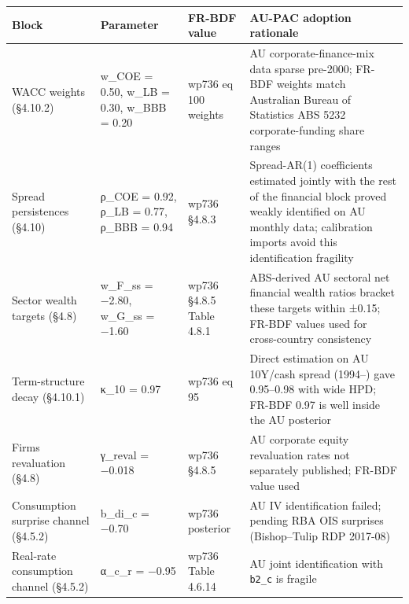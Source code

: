 \documentclass[
]{article}
\newcounter{none} %
\begin{document}
{\def\LTcaptype{none} %
\begin{longtable}[]{@{}
  >{\raggedright\arraybackslash}p{}
  >{\raggedright\arraybackslash}p{}
  >{\raggedright\arraybackslash}p{}
  >{\raggedright\arraybackslash}p{}@{}}
\toprule\noalign{}
\begin{minipage}[b]{\linewidth}\raggedright
Block
\end{minipage} & \begin{minipage}[b]{\linewidth}\raggedright
Parameter
\end{minipage} & \begin{minipage}[b]{\linewidth}\raggedright
FR-BDF value
\end{minipage} & \begin{minipage}[b]{\linewidth}\raggedright
AU-PAC adoption rationale
\end{minipage} \\
\midrule\noalign{}
\endhead
\bottomrule\noalign{}
\endlastfoot
WACC weights (§4.10.2) & w\_COE = 0.50, w\_LB = 0.30, w\_BBB = 0.20 &
wp736 eq 100 weights & AU corporate-finance-mix data sparse pre-2000;
FR-BDF weights match Australian Bureau of Statistics ABS 5232
corporate-funding share ranges \\
Spread persistences (§4.10) & ρ\_COE = 0.92, ρ\_LB = 0.77, ρ\_BBB = 0.94
& wp736 §4.8.3 & Spread-AR(1) coefficients estimated jointly with the
rest of the financial block proved weakly identified on AU monthly data;
calibration imports avoid this identification fragility \\
Sector wealth targets (§4.8) & w\_F\_ss = −2.80, w\_G\_ss = −1.60 &
wp736 §4.8.5 Table 4.8.1 & ABS-derived AU sectoral net financial wealth
ratios bracket these targets within ±0.15; FR-BDF values used for
cross-country consistency \\
Term-structure decay (§4.10.1) & κ\_10 = 0.97 & wp736 eq 95 & Direct
estimation on AU 10Y/cash spread (1994--) gave 0.95--0.98 with wide HPD;
FR-BDF 0.97 is well inside the AU posterior \\
Firms revaluation (§4.8) & γ\_reval = −0.018 & wp736 §4.8.5 & AU
corporate equity revaluation rates not separately published; FR-BDF
value used \\
Consumption surprise channel (§4.5.2) & b\_di\_c = −0.70 & wp736
posterior & AU IV identification failed; pending RBA OIS surprises
(Bishop--Tulip RDP 2017-08) \\
Real-rate consumption channel (§4.5.2) & α\_c\_r = −0.95 & wp736 Table
4.6.14 & AU joint identification with \texttt{b2\_c} is fragile \\
\end{longtable}
}
\end{document}
